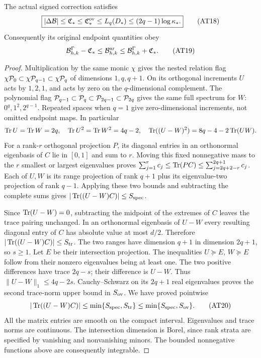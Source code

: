 \begin{theorem}
The actual signed correction satisfies
\[
\boxed{|\Delta\mathcal B|\le\mathfrak C_*
 \le\mathfrak C_*^{\rm ov}\le L_q(D_*)
 \le(2q-1)\log\kappa_* .}\tag{AT18}
\]
Consequently its original endpoint quantities obey
\[
\mathcal B^\Gamma_{h,k}-\mathfrak C_*
 \le\mathcal B^{\mathrm{ar}}_{h,k}
 \le\mathcal B^\Gamma_{h,k}+\mathfrak C_* .\tag{AT19}
\]
\end{theorem}
\begin{proof}
Multiplication by the same monic $\chi$ gives the nested relation
flag $\chi\mathcal P_0\subset\chi\mathcal P_{q-1}\subset\chi\mathcal P_q$ of
dimensions $1,q,q+1$. On its orthogonal increments $U$ acts by
$1,2,1$, and acts by zero on the $q$-dimensional complement.
The polynomial flag $\mathcal P_{q-1}\subset\mathcal P_q\subset\mathcal P_{2q-1}
\subset\mathcal P_{2q}$ gives the same full spectrum for $W$:
$0^q,1^2,2^{q-1}$. Repeated spaces when $q=1$ give zero-dimensional
increments, not omitted endpoint maps. In particular
\[
\operatorname{Tr} U=\operatorname{Tr} W=2q,\quad \operatorname{Tr} U^2=\operatorname{Tr} W^2=4q-2,
\quad\operatorname{Tr}((U-W)^2)=8q-4-2\operatorname{Tr}(UW).
\]
For a rank-$r$ orthogonal projection $P$, its diagonal entries in
an orthonormal eigenbasis of $C$ lie in $[0,1]$ and sum to $r$.
Moving this fixed nonnegative mass to the $r$ smallest or largest
eigenvalues proves
$\sum_{j=1}^r c_j\le\operatorname{Tr}(PC)\le\sum_{j=2q+2-r}^{2q+1}c_j$.
Each of $U,W$ is its range projection of rank $q+1$ plus its
eigenvalue-two projection of rank $q-1$. Applying these two bounds
and subtracting the complete sums gives $|\operatorname{Tr}((U-W)C)|\le S_{\rm spec}$.

Since $\operatorname{Tr}(U-W)=0$, subtracting the midpoint of the extremes of
$C$ leaves the trace pairing unchanged. In an orthonormal eigenbasis
of $U-W$ every resulting diagonal entry of $C$ has absolute value
at most $d/2$. Therefore $|\operatorname{Tr}((U-W)C)|\le S_{\rm tr}$.
The two ranges have dimension $q+1$ in dimension $2q+1$, so $s\ge1$.
Let $E$ be their intersection projection. The inequalities
$U\succeq E$, $W\succeq E$ follow from their nonzero eigenvalues
being at least one. The two positive differences have trace $2q-s$;
their difference is $U-W$. Thus $\|U-W\|_1\le4q-2s$.
Cauchy--Schwarz on its $2q+1$ real eigenvalues proves the second
trace-norm upper bound in $S_{\rm ov}$. We have proved pointwise
\[
|\operatorname{Tr}((U-W)C)|\le\min\{S_{\rm spec},S_{\rm tr}\}
 \le\min\{S_{\rm spec},S_{\rm ov}\}.\tag{AT20}
\]
All the matrix entries are smooth on the compact interval. Eigenvalues
and trace norms are continuous. The intersection dimension is Borel,
since rank strata are specified by vanishing and nonvanishing minors.
The bounded nonnegative functions above are consequently integrable.


\end{proof}
